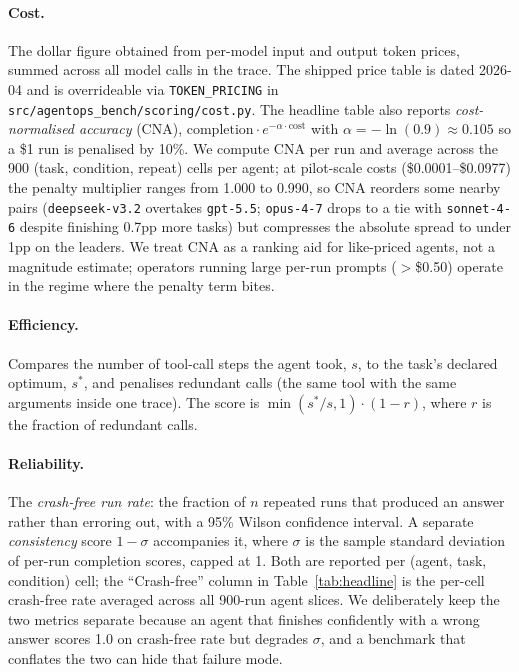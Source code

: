 \paragraph{Cost.} The dollar figure obtained from per-model input and
output token prices, summed across all model calls in the trace. The
shipped price table is dated 2026-04 and is overrideable via
\texttt{TOKEN\_PRICING} in \texttt{src/agentops\_bench/scoring/cost.py}.
The headline table also reports \emph{cost-normalised accuracy} (CNA),
$\mathrm{completion} \cdot e^{-\alpha \cdot \mathrm{cost}}$ with
$\alpha = -\ln(0.9) \approx 0.105$ so a \$1 run is penalised by 10\%.
We compute CNA per run and average across the 900 (task, condition,
repeat) cells per agent; at pilot-scale costs (\$0.0001--\$0.0977) the
penalty multiplier ranges from 1.000 to 0.990, so CNA reorders some
nearby pairs (\texttt{deepseek-v3.2} overtakes \texttt{gpt-5.5};
\texttt{opus-4-7} drops to a tie with \texttt{sonnet-4-6} despite
finishing 0.7pp more tasks) but compresses the absolute spread to under
1pp on the leaders. We treat CNA as a ranking aid for like-priced
agents, not a magnitude estimate; operators running large per-run
prompts ($>$\$0.50) operate in the regime where the penalty term bites.

\paragraph{Efficiency.} Compares the number of tool-call steps the agent
took, $s$, to the task's declared optimum, $s^*$, and penalises redundant
calls (the same tool with the same arguments inside one trace). The
score is $\min(s^*/s, 1) \cdot (1 - r)$, where $r$ is the fraction of
redundant calls.

\paragraph{Reliability.} The \emph{crash-free run rate}: the fraction of
$n$ repeated runs that produced an answer rather than erroring out, with
a 95\% Wilson confidence interval. A separate \emph{consistency} score
$1 - \sigma$ accompanies it, where $\sigma$ is the sample standard
deviation of per-run completion scores, capped at 1. Both are reported
per (agent, task, condition) cell; the ``Crash-free'' column in
Table~\ref{tab:headline} is the per-cell crash-free rate averaged across
all 900-run agent slices. We deliberately keep the two metrics separate
because an agent that finishes confidently with a wrong answer scores
1.0 on crash-free rate but degrades $\sigma$, and a benchmark that
conflates the two can hide that failure mode.


